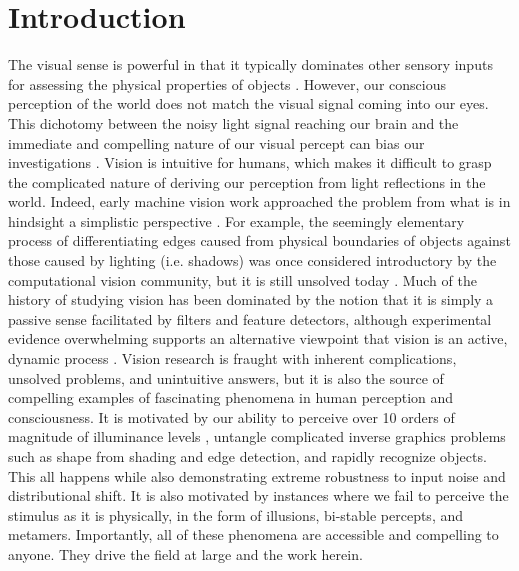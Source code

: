 \chapter{Introduction}\label{ch:intro}
The visual sense is powerful in that it typically dominates other sensory inputs for assessing the physical properties of objects \parencite{ernst2002humans}. However, our conscious perception of the world does not match the visual signal coming into our eyes. This dichotomy between the noisy light signal reaching our brain and the immediate and compelling nature of our visual percept can bias our investigations \parencite{rodieck1998first}. Vision is intuitive for humans, which makes it difficult to grasp the complicated nature of deriving our perception from light reflections in the world. Indeed, early machine vision work approached the problem from what is in hindsight a simplistic perspective \parencite{papert1966summer}. For example, the seemingly elementary process of differentiating edges caused from physical boundaries of objects against those caused by lighting (i.e. shadows) was once considered introductory by the computational vision community, but it is still unsolved today \parencite{adelson2000lightness, barron2012shape}. Much of the history of studying vision has been dominated by the notion that it is simply a passive sense facilitated by filters and feature detectors, although experimental evidence overwhelming supports an alternative viewpoint that vision is an active, dynamic process \parencite{olshausen201320}. Vision research is fraught with inherent complications, unsolved problems, and unintuitive answers, but it is also the source of compelling examples of fascinating phenomena in human perception and consciousness. It is motivated by our ability to perceive over 10 orders of magnitude of illuminance levels \parencite{norton2002psychophysical}, untangle complicated inverse graphics problems such as shape from shading and edge detection, and rapidly recognize objects. This all happens while also demonstrating extreme robustness to input noise and distributional shift. It is also motivated by instances where we fail to perceive the stimulus as it is physically, in the form of illusions, bi-stable percepts, and metamers. Importantly, all of these phenomena are accessible and compelling to anyone. They drive the field at large and the work herein.

